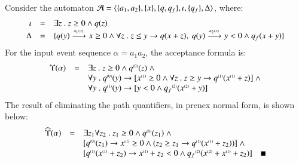 \begin{example}\label{ex:quant-elim}
  Consider the automaton $\mathcal{A} = \langle \{ a_1,a_2 \}, \{ x \},
    \{ q,q_f \}, \iota, \{ q_f \}, \Delta \rangle$, where:
  \[\begin{array}{rcl}
  \iota & = & \exists z ~.~ z \geq 0 \wedge q(z) \\
  \Delta & = & \{ 
    q(y) \xrightarrow{{\scriptscriptstyle a_1(x)}}_{{\scriptstyle }} x\geq 0 \wedge \forall z ~.~ z \leq y \rightarrow q(x+z),~
    q(y) \xrightarrow{{\scriptscriptstyle a_2(x)}}_{{\scriptstyle }} y<0 \wedge q_f(x+y)
   \}
  \end{array}\]
  For the input event sequence $\alpha = a_1a_2$, the acceptance
  formula is:
  \[\begin{array}{rcl}
  \Upsilon({\alpha}) & = & \exists z ~.~ z \geq 0 \wedge {q}^{\scriptscriptstyle{({0})}}(z) ~\wedge \\
  && \forall y ~.~ {q}^{\scriptscriptstyle{({0})}}(y) \rightarrow [{x}^{\scriptscriptstyle{({1})}}\geq0 \wedge \forall z ~.~ z\geq y 
    \rightarrow {q}^{\scriptscriptstyle{({1})}}({x}^{\scriptscriptstyle{({1})}}+z)] ~\wedge \\
  && \forall y ~.~ {q}^{\scriptscriptstyle{({1})}}(y) \rightarrow [y<0 \wedge {q_f}^{\scriptscriptstyle{({2})}}({x}^{\scriptscriptstyle{({2})}}+y)]
  \end{array}\]
  The result of eliminating the path quantifiers, in prenex normal form, is shown below:
  \[\begin{array}{rcl}
  \quantform{\alpha} & = & \exists z_1\forall z_2 ~.~ z_1 \geq 0 \wedge \stamp{q}{0}(z_1) ~\wedge \\
  && [\stamp{q}{0}(z_1) \rightarrow \stamp{x}{1} \geq 0 \wedge (z_2 \geq z_1 \rightarrow \stamp{q}{1}(\stamp{x}{1}+z_2))] ~\wedge \\
  && [\stamp{q}{1}(\stamp{x}{1}+z_2) \rightarrow \stamp{x}{1}+z_2 < 0 \wedge \stamp{q_f}{2}(\stamp{x}{2}+\stamp{x}{1}+z_2)] 
  \enspace\enspace\hfill\blacksquare
  \end{array}\]
\end{example}

